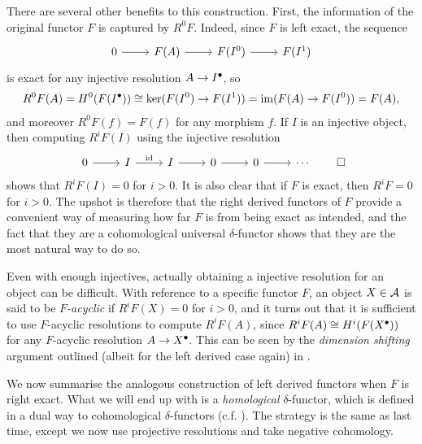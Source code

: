 There are several other benefits to this construction.
First, the information of the original functor $F$ is captured by $R^0F$.
Indeed, since $F$ is left exact, the sequence
\[
  \begin{tikzcd}
    0 & {F(A)} & {F(I^0)} & {F(I^1)}
    \arrow[from=1-1, to=1-2]
    \arrow[from=1-2, to=1-3]
    \arrow[from=1-3, to=1-4]
  \end{tikzcd}
\]
is exact for any injective resolution $A \to {{I}}^{\bullet}$, so
\begin{align*}
  R^0F(A)
  = H^0(F({{I}}^{\bullet}))
  \cong \ker(F(I^0) \to F(I^1))
  = \operatorname{im}(F(A) \to F(I^0))
  = F(A),
\end{align*}
and moreover $R^0F(f) = F(f)$ for any morphism $f$.
If $I$ is an injective object, then computing $R^iF(I)$ using the
injective resolution
\[
  \begin{tikzcd}
    0 & I & I & 0 & 0 & \cdots
    \arrow[from=1-1, to=1-2]
    \arrow["\id", from=1-2, to=1-3]
    \arrow[from=1-3, to=1-4]
    \arrow[from=1-4, to=1-5]
    \arrow[from=1-5, to=1-6]
  \end{tikzcd} \qedhere
\]
shows that $R^iF(I) = 0$ for $i > 0$.
It is also clear that if $F$ is exact, then $R^iF = 0$ for $i > 0$.
The upshot is therefore that the right derived functors of $F$
provide a convenient way of measuring how far $F$ is from being exact
as intended, and the fact that they are a cohomological universal
$\delta$-functor shows that they are the most natural way to do so.

\begin{remark}
  \label{rem_computing_with_F_acyclics}
  Even with enough injectives, actually obtaining a injective
  resolution for an object can be difficult.
  With reference to a specific functor $F$, an object $X \in
  \mathcal{A}$ is said to be \emph{$F$-acyclic} if $R^iF(X) = 0$ for $i
  > 0$, and it turns out that it is sufficient to use $F$-acyclic
  resolutions to compute $R^iF(A)$, since $R^iF(A) \cong
  H^i(F({{X}}^{\bullet}))$ for any $F$-acyclic resolution $A \to
  {{X}}^{\bullet}$.
  This can be seen by the \emph{dimension shifting} argument outlined
  (albeit for the left derived case again) in \cite[Exercise~2.4.3]{weibel}.
\end{remark}

We now summarise the analogous construction of left derived functors
when $F$ is right exact.
What we will end up with is a \emph{homological} $\delta$-functor,
which is defined in a dual way to cohomological $\delta$-functors
(c.f. \cite[Section~2.1]{weibel}).
The strategy is the same as last time, except we now use projective
resolutions and take negative cohomology.

